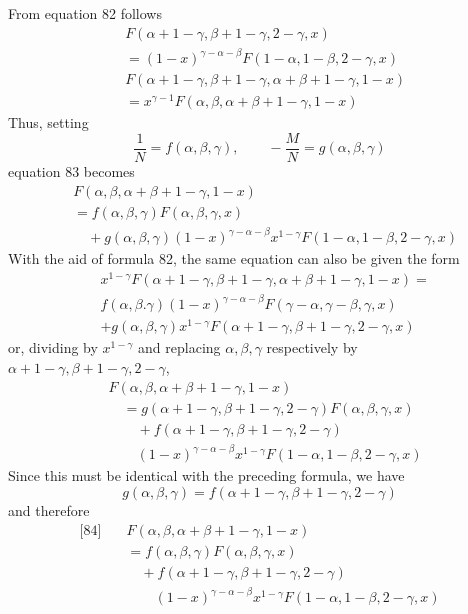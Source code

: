 
From equation 82 follows
\[
\begin{aligned}
&F(\alpha+1-\gamma,\beta+1-\gamma,2-\gamma,x)\\&=(1-x)^{\gamma-\alpha-\beta}F(1-\alpha,1-\beta,2-\gamma,x)\\[5pt]
&F(\alpha+1-\gamma,\beta+1-\gamma,\alpha+\beta+1-\gamma,1-x)\\&=x^{\gamma-1}F(\alpha,\beta,\alpha+\beta+1-\gamma,1-x)
\end{aligned}
\]
Thus, setting
\[
\frac{1}{N}=f(\alpha,\beta,\gamma),\qquad-\frac{M}{N}=g(\alpha,\beta,\gamma)
\]
equation 83 becomes
\[
\begin{aligned}
&F(\alpha,\beta,\alpha+\beta+1-\gamma,1-x)\\&=f(\alpha,\beta,\gamma)F(\alpha,\beta,\gamma,x)\\
&\quad+g(\alpha,\beta,\gamma)(1-x)^{\gamma-\alpha-\beta}x^{1-\gamma}F(1-\alpha,1-\beta,2-\gamma,x)
\end{aligned}
\]
With the aid of formula 82, the same equation can also be given the form
\[
\begin{aligned}
&x^{1-\gamma}F(\alpha+1-\gamma,\beta+1-\gamma,\alpha+\beta+1-\gamma,1-x)=\\
&f(\alpha,\beta.\gamma)(1-x)^{\gamma-\alpha-\beta}F(\gamma-\alpha,\gamma-\beta,\gamma,x)
\\&+g(\alpha,\beta,\gamma)x^{1-\gamma}F(\alpha+1-\gamma,\beta+1-\gamma,2-\gamma,x)
\end{aligned}
\]
or, dividing by \(x^{1-\gamma}\) and replacing \(\alpha,\beta,\gamma\) respectively by \(\alpha+1-\gamma,\beta+1-\gamma,2-\gamma\),
\[
\begin{aligned}
&F(\alpha,\beta,\alpha+\beta+1-\gamma,1-x)\\
&\quad=g(\alpha+1-\gamma,\beta+1-\gamma,2-\gamma)F(\alpha,\beta,\gamma,x)\\
&\qquad+f(\alpha+1-\gamma,\beta+1-\gamma,2-\gamma)\\&\qquad(1-x)^{\gamma-\alpha-\beta}x^{1-\gamma}F(1-\alpha,1-\beta,2-\gamma,x)
\end{aligned}
\]
Since this must be identical with the preceding formula, we have
\[
g(\alpha,\beta,\gamma)=f(\alpha+1-\gamma,\beta+1-\gamma,2-\gamma)
\]
and therefore
\[
\begin{aligned}
\text{[84]}\quad &F(\alpha,\beta,\alpha+\beta+1-\gamma,1-x)\\
&=f(\alpha,\beta,\gamma)F(\alpha,\beta,\gamma,x)\\
&\quad+f(\alpha+1-\gamma,\beta+1-\gamma,2-\gamma)\\&\qquad(1-x)^{\gamma-\alpha-\beta}x^{1-\gamma}F(1-\alpha,1-\beta,2-\gamma,x)
\end{aligned}
\]
